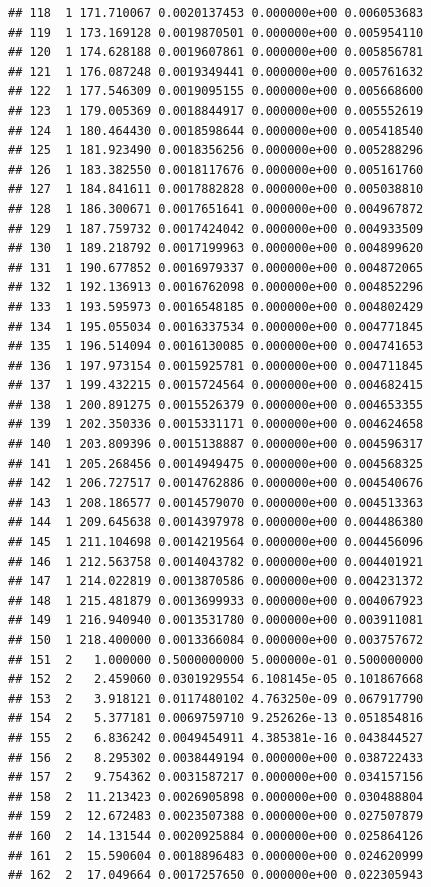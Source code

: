 \documentclass[article]{jss}\usepackage[]{graphicx}\usepackage[]{xcolor}
\makeatletter
\newenvironment{kframe}{%
 \def\at@end@of@kframe{}%
 \ifinner\ifhmode%
  \def\at@end@of@kframe{\end{minipage}}%
  \begin{minipage}{\columnwidth}%
 \fi\fi%
 \def\FrameCommand##1{\hskip\@totalleftmargin \hskip-\fboxsep
 \colorbox{shadecolor}{##1}\hskip-\fboxsep
     \hskip-\linewidth \hskip-\@totalleftmargin \hskip\columnwidth}%
 \MakeFramed {\advance\hsize-\width
   \@totalleftmargin\z@ \linewidth\hsize
   \@setminipage}}%
 {\par\unskip\endMakeFramed%
 \at@end@of@kframe}
\newenvironment{knitrout}{}{} %
\makeatother
\begin{document}
\begin{knitrout}
\begin{kframe}
\begin{verbatim}
## 118  1 171.710067 0.0020137453 0.000000e+00 0.006053683
## 119  1 173.169128 0.0019870501 0.000000e+00 0.005954110
## 120  1 174.628188 0.0019607861 0.000000e+00 0.005856781
## 121  1 176.087248 0.0019349441 0.000000e+00 0.005761632
## 122  1 177.546309 0.0019095155 0.000000e+00 0.005668600
## 123  1 179.005369 0.0018844917 0.000000e+00 0.005552619
## 124  1 180.464430 0.0018598644 0.000000e+00 0.005418540
## 125  1 181.923490 0.0018356256 0.000000e+00 0.005288296
## 126  1 183.382550 0.0018117676 0.000000e+00 0.005161760
## 127  1 184.841611 0.0017882828 0.000000e+00 0.005038810
## 128  1 186.300671 0.0017651641 0.000000e+00 0.004967872
## 129  1 187.759732 0.0017424042 0.000000e+00 0.004933509
## 130  1 189.218792 0.0017199963 0.000000e+00 0.004899620
## 131  1 190.677852 0.0016979337 0.000000e+00 0.004872065
## 132  1 192.136913 0.0016762098 0.000000e+00 0.004852296
## 133  1 193.595973 0.0016548185 0.000000e+00 0.004802429
## 134  1 195.055034 0.0016337534 0.000000e+00 0.004771845
## 135  1 196.514094 0.0016130085 0.000000e+00 0.004741653
## 136  1 197.973154 0.0015925781 0.000000e+00 0.004711845
## 137  1 199.432215 0.0015724564 0.000000e+00 0.004682415
## 138  1 200.891275 0.0015526379 0.000000e+00 0.004653355
## 139  1 202.350336 0.0015331171 0.000000e+00 0.004624658
## 140  1 203.809396 0.0015138887 0.000000e+00 0.004596317
## 141  1 205.268456 0.0014949475 0.000000e+00 0.004568325
## 142  1 206.727517 0.0014762886 0.000000e+00 0.004540676
## 143  1 208.186577 0.0014579070 0.000000e+00 0.004513363
## 144  1 209.645638 0.0014397978 0.000000e+00 0.004486380
## 145  1 211.104698 0.0014219564 0.000000e+00 0.004456096
## 146  1 212.563758 0.0014043782 0.000000e+00 0.004401921
## 147  1 214.022819 0.0013870586 0.000000e+00 0.004231372
## 148  1 215.481879 0.0013699933 0.000000e+00 0.004067923
## 149  1 216.940940 0.0013531780 0.000000e+00 0.003911081
## 150  1 218.400000 0.0013366084 0.000000e+00 0.003757672
## 151  2   1.000000 0.5000000000 5.000000e-01 0.500000000
## 152  2   2.459060 0.0301929554 6.108145e-05 0.101867668
## 153  2   3.918121 0.0117480102 4.763250e-09 0.067917790
## 154  2   5.377181 0.0069759710 9.252626e-13 0.051854816
## 155  2   6.836242 0.0049454911 4.385381e-16 0.043844527
## 156  2   8.295302 0.0038449194 0.000000e+00 0.038722433
## 157  2   9.754362 0.0031587217 0.000000e+00 0.034157156
## 158  2  11.213423 0.0026905898 0.000000e+00 0.030488804
## 159  2  12.672483 0.0023507388 0.000000e+00 0.027507879
## 160  2  14.131544 0.0020925884 0.000000e+00 0.025864126
## 161  2  15.590604 0.0018896483 0.000000e+00 0.024620999
## 162  2  17.049664 0.0017257650 0.000000e+00 0.022305943

\end{verbatim}
\end{kframe}
\end{knitrout}
\end{document}
